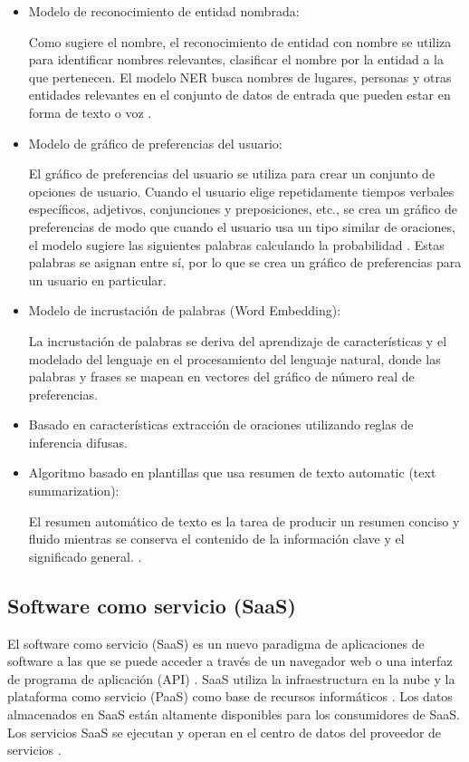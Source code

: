 \documentclass[../Main.tex]{subfiles}
\begin{document}
\begin{itemize}
	\item Modelo de reconocimiento de entidad nombrada:\par
     Como sugiere el nombre, el reconocimiento de entidad con nombre se utiliza para identificar nombres relevantes, clasificar el nombre por la entidad a la que pertenecen. El modelo NER busca nombres de lugares, personas y otras entidades relevantes en el conjunto de datos de entrada que pueden estar en forma de texto o voz \cite{18}.
    
    \item Modelo de gráfico de preferencias del usuario:\par
     El gráfico de preferencias del usuario se utiliza para crear un conjunto de opciones de usuario. Cuando el usuario elige repetidamente tiempos verbales específicos, adjetivos, conjunciones y preposiciones, etc., se crea un gráfico de preferencias de modo que cuando el usuario usa un tipo similar de oraciones, el modelo sugiere las siguientes palabras calculando la probabilidad \cite{19}. Estas palabras se asignan entre sí, por lo que se crea un gráfico de preferencias para un usuario en particular.

    \item Modelo de incrustación de palabras (Word Embedding): \par
     La incrustación de palabras se deriva del aprendizaje de características y el modelado del lenguaje en el procesamiento del lenguaje natural, donde las palabras y frases se mapean en vectores del gráfico de número real de preferencias.
    
    \item Basado en características extracción de oraciones utilizando reglas de inferencia difusas. \par
    
	\item Algoritmo basado en plantillas que usa resumen de texto automatic (text summarization): \par
     El resumen automático de texto es la tarea de producir un resumen conciso y fluido mientras se conserva el contenido de la información clave y el significado general.  \cite{20}.

\end{itemize}\par

\subsection{Software como servicio (SaaS)}
\begin{justify}
El software como servicio (SaaS) \cite{21} es un nuevo paradigma de aplicaciones de software a las que se puede acceder a través de un navegador web o una interfaz de programa de aplicación (API) \cite{22}. SaaS utiliza la infraestructura en la nube y la plataforma como servicio (PaaS) como base de recursos informáticos \cite{23}. Los datos almacenados en SaaS están altamente disponibles para los consumidores de SaaS. Los servicios SaaS se ejecutan y operan en el centro de datos del proveedor de servicios \cite{24}.
\end{justify}\par
\end{document}
